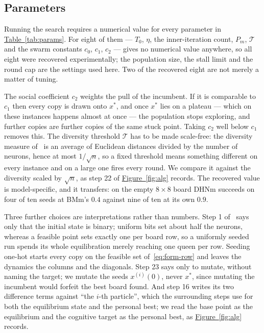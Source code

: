 \documentclass{easychair}
\newcommand{\citeref}[1]{\textcolor{academicpurple}{\cite{#1}}}
\newcommand{\tabref}[1]{\textcolor{academicpurple}{\hyperref[#1]{Table~\ref*{#1}}}}
\newcommand{\figref}[1]{\textcolor{academicpurple}{\hyperref[#1]{Figure~\ref*{#1}}}}
\begin{document}
\subsection*{Parameters}

Running the search requires a numerical value for every parameter in \tabref{tab:params}. For eight
of them --- $T_0$, $\eta$, the inner-iteration count, $P_m$, $\mathcal{T}$ and the swarm constants
$c_0$, $c_1$, $c_2$ --- \citeref{liwang2022} gives no numerical value anywhere, so all eight were
recovered experimentally; the population size, the stall limit and the round cap are the settings
used here. Two of the recovered eight are not merely a matter of tuning.

The social coefficient $c_2$ weights the pull of the incumbent. If it is comparable to $c_1$ then
every copy is drawn onto $x^{*}$, and once $x^{*}$ lies on a plateau --- which on these instances
happens almost at once --- the population stops exploring, and further copies are further copies of
the same stuck point. Taking $c_2$ well below $c_1$ removes this. The diversity threshold
$\mathcal{T}$ has to be made scale-free: the diversity measure of~\citeref{liwang2022} is an average
of Euclidean distances divided by the number of neurons, hence at most $1/\sqrt{n}$, so a fixed
threshold means something different on every instance and on a large one fires every round. We
compare it against the diversity scaled by $\sqrt{n}$, as step 22 of \figref{fig:alg} records. The
recovered value is model-specific, and it transfers: on the empty $8 \times 8$ board DHNm succeeds
on four of ten seeds at BMm's $0.4$ against nine of ten at its own $0.9$.

Three further choices are interpretations rather than numbers. Step 1 of~\citeref{liwang2022} says
only that the initial state is binary; uniform bits set about half the neurons, whereas a feasible
point sets exactly one per board row, so a uniformly seeded run spends its whole equilibration
merely reaching one queen per row. Seeding one-hot starts every copy on the feasible set
of~\eqref{eq:form-row} and leaves the dynamics the columns and the diagonals. Step 23 says only to
mutate, without naming the target; we mutate the seeds $x^{(i)}(0)$, never $x^{*}$, since mutating
the incumbent would forfeit the best board found. And step 16 writes its two difference terms
against \enquote{the $i$-th particle}, which the surrounding steps use for both the equilibrium
state and the personal best; we read the base point as the equilibrium and the cognitive target as
the personal best, as \figref{fig:alg} records.
\end{document}
